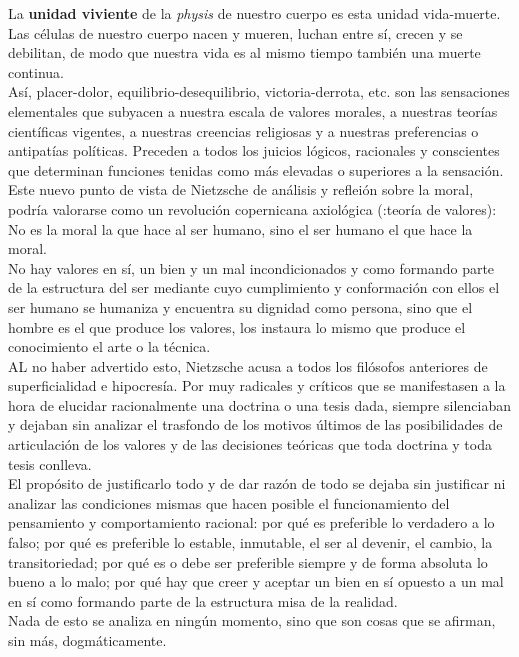 \documentclass[a4paper, 10pt, twocolumn, spanish]{article}
\begin{document}
La \textbf{unidad viviente} de la \emph{physis} de nuestro cuerpo es esta unidad
vida-muerte. Las células de nuestro cuerpo nacen y mueren, luchan
entre sí, crecen y se debilitan, de modo que nuestra vida es al mismo
tiempo también una muerte continua.\\[0pt]
Así, placer-dolor, equilibrio-desequilibrio, victoria-derrota,
etc. son las sensaciones elementales que subyacen a nuestra escala de
valores morales, a nuestras teorías científicas vigentes, a nuestras
creencias religiosas y a nuestras preferencias o antipatías
políticas. Preceden a todos los juicios lógicos, racionales y
conscientes que determinan funciones tenidas como más elevadas o
superiores a la sensación.\\[0pt]

Este nuevo punto de vista de Nietzsche de análisis y refleión sobre la
moral, podría valorarse como un revolución copernicana axiológica
(:teoría de valores): No es la moral la que hace al ser humano, sino
el ser humano el que hace la moral.\\[0pt]
No hay valores en sí, un bien y un mal incondicionados y como formando
parte de la estructura del ser mediante cuyo cumplimiento y
conformación con ellos el ser humano se humaniza y encuentra su
dignidad como persona, sino que el hombre es el que produce los
valores, los instaura lo mismo que produce el conocimiento el arte o
la técnica.\\[0pt]

AL no haber advertido esto, Nietzsche acusa a todos los filósofos
anteriores de superficialidad e hipocresía. Por muy radicales y
críticos que se manifestasen a la hora de elucidar racionalmente una
doctrina o una tesis dada, siempre silenciaban y dejaban sin analizar
el trasfondo de los motivos últimos de las posibilidades de
articulación de los valores y de las decisiones teóricas que toda
doctrina y toda tesis conlleva.\\[0pt]
El propósito de justificarlo todo y de dar razón de todo se dejaba sin
justificar ni analizar las condiciones mismas que hacen posible el
funcionamiento del pensamiento y comportamiento racional: por qué es
preferible lo verdadero a lo falso; por qué es preferible lo estable,
inmutable, el ser al devenir, el cambio, la transitoriedad; por qué es
o debe ser preferible siempre y de forma absoluta lo bueno a lo malo;
por qué hay que creer y aceptar un bien en sí opuesto a un mal en sí
como formando parte de la estructura misa de la realidad.\\[0pt]
Nada de esto se analiza en ningún momento, sino que son cosas que se
afirman, sin más, dogmáticamente.\\[0pt]
\end{document}
